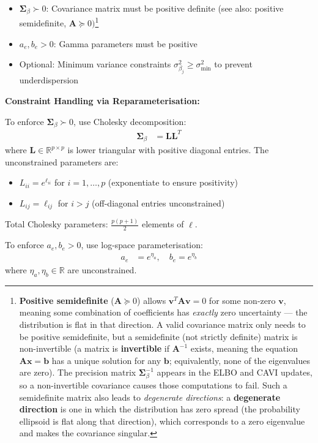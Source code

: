 \documentclass[11pt,a4paper]{article}
\newcommand{\R}{\mathbb{R}}
\begin{document}
\begin{itemize}
\item $\bm{\Sigma}_\beta \succ 0$: Covariance matrix must be positive definite (see also: positive semidefinite, $\bm{A} \succeq 0)$\footnote{\textbf{Positive semidefinite} ($\bm{A} \succeq 0$) allows $\bm{v}^T\bm{A}\bm{v} = 0$ for some non-zero $\bm{v}$, meaning some combination of coefficients has \emph{exactly} zero uncertainty --- the distribution is flat in that direction. A valid covariance matrix only needs to be positive semidefinite, but a semidefinite (not strictly definite) matrix is non-invertible (a matrix is \textbf{invertible} if $\bm{A}^{-1}$ exists, meaning the equation $\bm{A}\bm{x}=\bm{b}$ has a unique solution for any $\bm{b}$; equivalently, none of the eigenvalues are zero). The precision matrix $\bm{\Sigma}_\beta^{-1}$ appears in the ELBO and CAVI updates, so a non-invertible covariance causes those computations to fail. Such a semidefinite matrix also leads to \emph{degenerate directions}: a \textbf{degenerate direction} is one in which the distribution has zero spread (the probability ellipsoid is flat along that direction), which corresponds to a zero eigenvalue and makes the covariance singular.}
\item $a_e, b_e > 0$: Gamma parameters must be positive
\item Optional: Minimum variance constraints $\sigma^2_{\beta_j} \geq \sigma^2_{\text{min}}$ to prevent underdispersion
\end{itemize}

\textbf{Constraint Handling via Reparameterisation:}

To enforce $\bm{\Sigma}_\beta \succ 0$, use Cholesky decomposition:
\begin{align}
\bm{\Sigma}_\beta &= \bm{L}\bm{L}^T
\end{align}
where $\bm{L} \in \R^{p \times p}$ is lower triangular with positive diagonal entries. The unconstrained parameters are:
\begin{itemize}
\item $L_{ii} = e^{\ell_{ii}}$ for $i=1,\ldots,p$ (exponentiate to ensure positivity)
\item $L_{ij} = \ell_{ij}$ for $i > j$ (off-diagonal entries unconstrained)
\end{itemize}

Total Cholesky parameters: $\frac{p(p+1)}{2}$ elements of $\bm{\ell}$.

To enforce $a_e, b_e > 0$, use log-space parameterisation:
\begin{align}
a_e &= e^{\eta_a}, \quad b_e = e^{\eta_b}
\end{align}
where $\eta_a, \eta_b \in \R$ are unconstrained.
\end{document}
